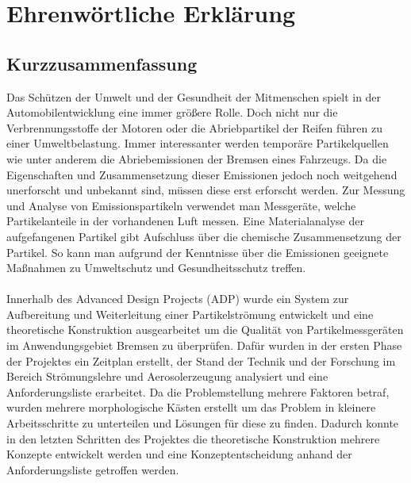 \documentclass[longdoc,accentcolor=tud1b,11pt,paper=a4]{tudreport}
\title{\fzdTitle}
\subtitle{\fzdThesisType \fzdID}
\begin{document}
	\frenchspacing
	\raggedbottom
	\maketitle
	
	\chapter*{Ehrenw\"{o}rtliche Erkl\"{a}rung}
	
	\newpage	
	
	\section*{Kurzzusammenfassung}
Das Schützen der Umwelt und der Gesundheit der 		Mitmenschen spielt in der Automobilentwicklung eine immer größere Rolle. Doch nicht nur die Verbrennungsstoffe der Motoren oder die Abriebpartikel der Reifen führen zu einer Umweltbelastung. Immer interessanter werden temporäre Partikelquellen wie unter anderem die Abriebemissionen der Bremsen eines Fahrzeugs. Da die Eigenschaften und Zusammensetzung dieser Emissionen jedoch noch weitgehend unerforscht und unbekannt sind, müssen diese erst erforscht werden. Zur Messung und Analyse von Emissionspartikeln verwendet man Messgeräte, welche Partikelanteile in der  vorhandenen Luft messen. Eine Materialanalyse der aufgefangenen Partikel gibt Aufschluss über die chemische Zusammensetzung der Partikel. So kann man aufgrund der Kenntnisse über die Emissionen geeignete Maßnahmen zu Umweltschutz und Gesundheitsschutz treffen.
	\\
	\\
Innerhalb des Advanced Design Projects (ADP) wurde ein System zur Aufbereitung und Weiterleitung einer Partikelströmung entwickelt und eine theoretische Konstruktion ausgearbeitet um die Qualität von Partikelmessgeräten im Anwendungsgebiet Bremsen zu überprüfen. Dafür wurden in der ersten Phase der Projektes ein Zeitplan erstellt, der Stand der Technik und der Forschung im Bereich Strömungslehre und Aerosolerzeugung analysiert und eine Anforderungsliste erarbeitet. Da die Problemstellung mehrere Faktoren betraf, wurden mehrere morphologische Kästen erstellt um das Problem in kleinere Arbeitsschritte zu unterteilen und Lösungen für diese zu finden. Dadurch konnte in den letzten Schritten des Projektes die theoretische Konstruktion mehrere Konzepte entwickelt werden und eine Konzeptentscheidung anhand der Anforderungsliste getroffen werden.
\end{document}
